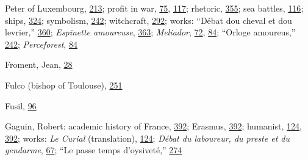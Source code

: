Peter of Luxembourg,
\protect\hyperlink{14_Chapter_Seven__THE_PIOUS_PERSONA.xhtmlux5cux23page_213}{213};
profit in war,
\protect\hyperlink{10_Chapter_Three__THE_HEROIC_DREAM.xhtmlux5cux23page_75}{75},
\protect\hyperlink{10_Chapter_Three__THE_HEROIC_DREAM.xhtmlux5cux23page_117}{117};
rhetoric,
\protect\hyperlink{21_Chapter_Thirteen__IMAGE_AND_WORD.xhtmlux5cux23page_355}{355};
sea battles,
\protect\hyperlink{10_Chapter_Three__THE_HEROIC_DREAM.xhtmlux5cux23page_116}{116};
ships,
\protect\hyperlink{20_ILLUSTRATIONS_FOLLOW_PAGE.xhtmlux5cux23page_324}{324};
symbolism,
\protect\hyperlink{16_Chapter_Nine__THE_DECLINE_OF_SYM.xhtmlux5cux23page_242}{242};
witchcraft,
\protect\hyperlink{18_Chapter_Eleven__THE_FORMS_OF_THO.xhtmlux5cux23page_292}{292};
works: ``Débat dou cheval et dou levrier,''
\protect\hyperlink{21_Chapter_Thirteen__IMAGE_AND_WORD.xhtmlux5cux23page_360}{360};
\emph{Espinette amoureuse},
\protect\hyperlink{21_Chapter_Thirteen__IMAGE_AND_WORD.xhtmlux5cux23page_363}{363};
\emph{Meliador},
\protect\hyperlink{10_Chapter_Three__THE_HEROIC_DREAM.xhtmlux5cux23page_72}{72},
\protect\hyperlink{10_Chapter_Three__THE_HEROIC_DREAM.xhtmlux5cux23page_84}{84};
``Orloge amoureus,''
\protect\hyperlink{16_Chapter_Nine__THE_DECLINE_OF_SYM.xhtmlux5cux23page_242}{242};
\emph{Perceforest},
\protect\hyperlink{10_Chapter_Three__THE_HEROIC_DREAM.xhtmlux5cux23page_84}{84}

\protect\hypertarget{25_INDEX.xhtmlux5cux23page_458}{}{}Froment, Jean,
\protect\hyperlink{08_Chapter_One__THE_PASSIONATE_INTE.xhtmlux5cux23page_28}{28}

Fulco (bishop of Toulouse),
\protect\hyperlink{17_Chapter_Ten__THE_FAILURE_OF_IMAG.xhtmlux5cux23page_251}{251}

Fusil,
\protect\hyperlink{10_Chapter_Three__THE_HEROIC_DREAM.xhtmlux5cux23page_96}{96}

Gaguin, Robert: academic history of France,
\protect\hyperlink{22_Chapter_Fourteen__THE_COMING_OF.xhtmlux5cux23page_392}{392};
Erasmus,
\protect\hyperlink{22_Chapter_Fourteen__THE_COMING_OF.xhtmlux5cux23page_392}{392};
humanist,
\protect\hyperlink{10_Chapter_Three__THE_HEROIC_DREAM.xhtmlux5cux23page_124}{124},
\protect\hyperlink{22_Chapter_Fourteen__THE_COMING_OF.xhtmlux5cux23page_392}{392};
works: \emph{Le Curial} (translation),
\protect\hyperlink{10_Chapter_Three__THE_HEROIC_DREAM.xhtmlux5cux23page_124}{124};
\emph{Débat du laboureur, du preste et du gendarme},
\protect\hyperlink{10_Chapter_Three__THE_HEROIC_DREAM.xhtmlux5cux23page_67}{67};
``Le passe temps d'oysiveté,''
\protect\hyperlink{18_Chapter_Eleven__THE_FORMS_OF_THO.xhtmlux5cux23page_274}{274}

